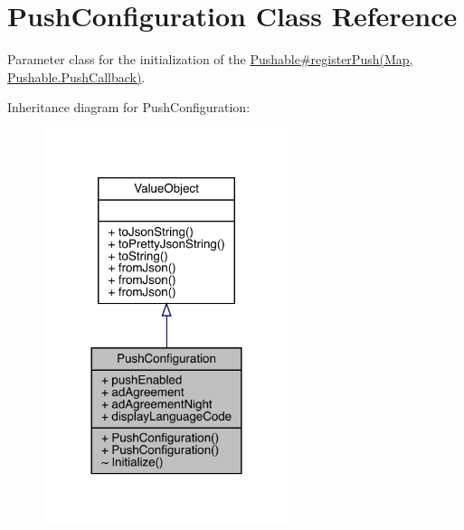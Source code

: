 \hypertarget{classcom_1_1toast_1_1android_1_1gamebase_1_1base_1_1push_1_1_push_configuration}{}\section{Push\+Configuration Class Reference}
\label{classcom_1_1toast_1_1android_1_1gamebase_1_1base_1_1push_1_1_push_configuration}


Parameter class for the initialization of the \hyperlink{}{Pushable\#register\+Push(\+Map, Pushable.\+Push\+Callback)}.  




Inheritance diagram for Push\+Configuration\+:
\nopagebreak
\begin{figure}[H]
\begin{center}
\leavevmode
\includegraphics[width=204pt]{classcom_1_1toast_1_1android_1_1gamebase_1_1base_1_1push_1_1_push_configuration__inherit__graph}
\end{center}
\end{figure}


